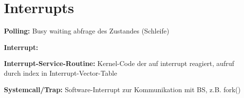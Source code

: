 \section{Interrupts}
\textbf{Polling:} Busy waiting abfrage des Zustandes (Schleife)

\textbf{Interrupt:} 


\textbf{Interrupt-Service-Routine:} Kernel-Code der auf interrupt reagiert, aufruf durch index in Interrupt-Vector-Table

\textbf{Systemcall/Trap: } Software-Interrupt zur Kommunikation mit BS, z.B. fork()

